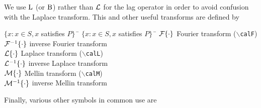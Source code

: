 \documentclass[11pt,dvips,a4paper]{article}
\newcommand{\hspacesymbols}%
   {$\{x: x \in S, x$ satisfies $P\}\;\;$} %
\newcommand{\type}[1]{{\tt$\backslash$#1}}
\begin{document}
We use $\mathrm{L}$ (or $\mathrm{B}$) rather than $\mathcal{L}$ for the lag operator in order to avoid
confusion with the Laplace transform. This and
other useful transforms are defined by
\begin{tabbing}
\hspacesymbols \= \hspacesymbols\qquad\quad \=  \kill
$\mathcal{F}\{\cdot\}$ \> Fourier transform (\type{calF}) \\
$\mathcal{F}^{-1}\{\cdot\}$ \> inverse Fourier transform \\
$\mathcal{L}\{\cdot\}$ \> Laplace transform (\type{calL}) \\
$\mathcal{L}^{-1}\{\cdot\}$ \> inverse Laplace transform \\
$\mathcal{M}\{\cdot\}$ \> Mellin transform (\type{calM}) \\
$\mathcal{M}^{-1}\{\cdot\}$ \> inverse Mellin transform
\end{tabbing}
Finally, various other symbols in common use are
\end{document}
